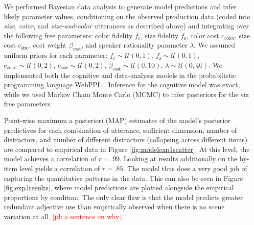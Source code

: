 \documentclass[11pt]{article}
\newcommand{\jd}[1]{\textcolor{Red}{[jd: #1]}}
\newcommand{\figref}[1]{Figure \ref{#1}}
\begin{document}

We performed Bayesian data analysis to generate model predictions and infer likely parameter values, conditioning on the observed production data (coded into \emph{size}, \emph{color}, and \emph{size-and-color} utterances as described above) and integrating over the following free parameters: color fidelity $f_{\textrm{c}}$, size fidelity $f_{\textrm{s}}$, color cost $c_{\textrm{color}}$, size cost $c_{\textrm{size}}$, cost weight $\beta_{\textrm{cost}}$, and speaker rationality parameter $\lambda$. We assumed uniform priors for each parameter: $f_{\textrm{c}} \sim \mathcal{U}(0,1)$, $f_{\textrm{s}} \sim \mathcal{U}(0,1)$, $c_{\textrm{color}} \sim \mathcal{U}(0,2)$, $c_{\textrm{size}} \sim \mathcal{U}(0,2)$, $\beta_{\textrm{cost}} \sim \mathcal{U}(0,10)$, $\lambda  \sim \mathcal{U}(0,40)$.
We implemented both the cognitive and data-analysis models in the probabilistic programming language WebPPL \cite{GoodmanStuhlmuller14_DIPPL}.
Inference for the cognitive model was exact, while we used Markov Chain Monte Carlo (MCMC) to infer posteriors for the six free parameters.

Point-wise maximum a posteriori (MAP) estimates of the model's posterior predictives for each combination of utterance, sufficient dimension, number of distractors, and number of different distractors (collapsing across different items) are compared to empirical data in \figref{fig:modelexp1scatter}. At this level, the model achieves a correlation of $r = .99$. Looking at results additionally on the by-item level yields a correlation of $r = .85$. The model thus does a very good job of capturing the quantitative patterns in the data. This can also be seen in \figref{fig:exp1results}, where model predictions are plotted alongside the empirical proportions by condition. The only clear flaw is that the model predicts greater redundant adjective use than empirically observed when there is no scene variation at all. \jd{a sentence on why}.
\end{document}
